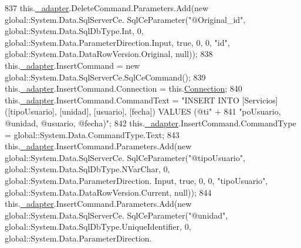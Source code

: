 \begin{DoxyCode}
837             this.\hyperlink{class_proyecto___integrador__3_1_1ds_servicios_table_adapters_1_1_servicios_table_adapter_adef36d1c06bafba740cd2cb94515689b}{\_adapter}.DeleteCommand.Parameters.Add(\textcolor{keyword}{new} global::System.Data.SqlServerCe.
      SqlCeParameter(\textcolor{stringliteral}{"@Original\_id"}, global::System.Data.SqlDbType.Int, 0, global::System.Data.ParameterDirection.Input, \textcolor{keyword}{
      true}, 0, 0, \textcolor{stringliteral}{"id"}, global::System.Data.DataRowVersion.Original, null));
838             this.\hyperlink{class_proyecto___integrador__3_1_1ds_servicios_table_adapters_1_1_servicios_table_adapter_adef36d1c06bafba740cd2cb94515689b}{\_adapter}.InsertCommand = \textcolor{keyword}{new} global::System.Data.SqlServerCe.SqlCeCommand();
839             this.\hyperlink{class_proyecto___integrador__3_1_1ds_servicios_table_adapters_1_1_servicios_table_adapter_adef36d1c06bafba740cd2cb94515689b}{\_adapter}.InsertCommand.Connection = this.\hyperlink{class_proyecto___integrador__3_1_1ds_servicios_table_adapters_1_1_servicios_table_adapter_afdc3759c0f8fd84ed6ae2943ee4855f5}{Connection};
840             this.\hyperlink{class_proyecto___integrador__3_1_1ds_servicios_table_adapters_1_1_servicios_table_adapter_adef36d1c06bafba740cd2cb94515689b}{\_adapter}.InsertCommand.CommandText = \textcolor{stringliteral}{"INSERT INTO [Servicios] ([tipoUsuario],
       [unidad], [usuario], [fecha]) VALUES (@ti"} +
841                 \textcolor{stringliteral}{"poUsuario, @unidad, @usuario, @fecha)"};
842             this.\hyperlink{class_proyecto___integrador__3_1_1ds_servicios_table_adapters_1_1_servicios_table_adapter_adef36d1c06bafba740cd2cb94515689b}{\_adapter}.InsertCommand.CommandType = global::System.Data.CommandType.Text;
843             this.\hyperlink{class_proyecto___integrador__3_1_1ds_servicios_table_adapters_1_1_servicios_table_adapter_adef36d1c06bafba740cd2cb94515689b}{\_adapter}.InsertCommand.Parameters.Add(\textcolor{keyword}{new} global::System.Data.SqlServerCe.
      SqlCeParameter(\textcolor{stringliteral}{"@tipoUsuario"}, global::System.Data.SqlDbType.NVarChar, 0, global::System.Data.ParameterDirection.
      Input, \textcolor{keyword}{true}, 0, 0, \textcolor{stringliteral}{"tipoUsuario"}, global::System.Data.DataRowVersion.Current, null));
844             this.\hyperlink{class_proyecto___integrador__3_1_1ds_servicios_table_adapters_1_1_servicios_table_adapter_adef36d1c06bafba740cd2cb94515689b}{\_adapter}.InsertCommand.Parameters.Add(\textcolor{keyword}{new} global::System.Data.SqlServerCe.
      SqlCeParameter(\textcolor{stringliteral}{"@unidad"}, global::System.Data.SqlDbType.UniqueIdentifier, 0, global::System.Data.ParameterDirection.

\end{DoxyCode}

